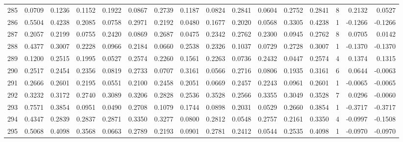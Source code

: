 \begin{tabular}{lrrrrrrrrrrrrrrr}
285 &      0.0709 &  0.1236 &  0.1152 &  0.1922 &  0.0867 &  0.2739 &  0.1187 &  0.0824 &  0.2841 &  0.0604 &   0.2752 &     0.2841 &      8 &                    0.2132 &                     0.0527 \\
286 &      0.5504 &  0.4238 &  0.2085 &  0.0758 &  0.2971 &  0.2192 &  0.0480 &  0.1677 &  0.2020 &  0.0568 &   0.3305 &     0.4238 &      1 &                   -0.1266 &                    -0.1266 \\
287 &      0.2057 &  0.2199 &  0.0755 &  0.2420 &  0.0869 &  0.2687 &  0.0475 &  0.2342 &  0.2762 &  0.2300 &   0.0945 &     0.2762 &      8 &                    0.0705 &                     0.0142 \\
288 &      0.4377 &  0.3007 &  0.2228 &  0.0966 &  0.2184 &  0.0660 &  0.2538 &  0.2326 &  0.1037 &  0.0729 &   0.2728 &     0.3007 &      1 &                   -0.1370 &                    -0.1370 \\
289 &      0.1200 &  0.2515 &  0.1995 &  0.0527 &  0.2574 &  0.2260 &  0.1561 &  0.2263 &  0.0736 &  0.2432 &   0.0447 &     0.2574 &      4 &                    0.1374 &                     0.1315 \\
290 &      0.2517 &  0.2454 &  0.2356 &  0.0819 &  0.2733 &  0.0707 &  0.3161 &  0.0566 &  0.2716 &  0.0806 &   0.1935 &     0.3161 &      6 &                    0.0644 &                    -0.0063 \\
291 &      0.2666 &  0.2601 &  0.2195 &  0.0551 &  0.2100 &  0.2458 &  0.2051 &  0.0669 &  0.2457 &  0.2243 &   0.0961 &     0.2601 &      1 &                   -0.0065 &                    -0.0065 \\
292 &      0.3232 &  0.3172 &  0.2740 &  0.3089 &  0.3206 &  0.2828 &  0.2536 &  0.3528 &  0.2566 &  0.3355 &   0.3049 &     0.3528 &      7 &                    0.0296 &                    -0.0060 \\
293 &      0.7571 &  0.3854 &  0.0951 &  0.0490 &  0.2708 &  0.1079 &  0.1744 &  0.0898 &  0.2031 &  0.0529 &   0.2660 &     0.3854 &      1 &                   -0.3717 &                    -0.3717 \\
294 &      0.4347 &  0.2839 &  0.2837 &  0.2871 &  0.3350 &  0.3277 &  0.0800 &  0.2812 &  0.0548 &  0.2757 &   0.2161 &     0.3350 &      4 &                   -0.0997 &                    -0.1508 \\
295 &      0.5068 &  0.4098 &  0.3568 &  0.0663 &  0.2789 &  0.2193 &  0.0901 &  0.2781 &  0.2412 &  0.0544 &   0.2535 &     0.4098 &      1 &                   -0.0970 &                    -0.0970 \\

\end{tabular}

